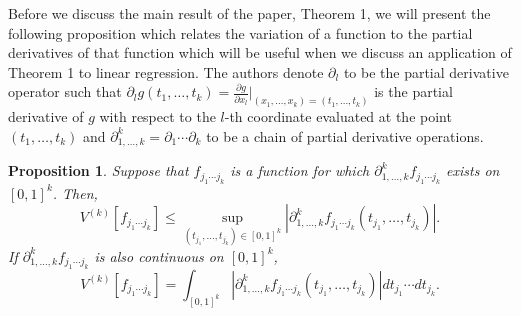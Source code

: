 \documentclass{article}
\newtheorem{proposition}{Proposition}
\begin{document}
Before we discuss the main result of the paper, Theorem 1, we will present the following proposition which relates the variation of a function to the partial derivatives of that function which will be useful when we discuss an application of Theorem 1 to linear regression. The authors denote $\partial_l$ to be the partial derivative operator such that $\partial_l g(t_1, \ldots, t_k) = \frac{\partial g}{\partial x_l} |_{(x_1, \ldots, x_k) = (t_1, \ldots, t_k)}$ is the partial derivative of $g$ with respect to the $l$-th coordinate evaluated at the point $(t_1, \ldots, t_k)$ and $\partial^{k}_{1, \ldots, k} = \partial_1 \cdots \partial_k$ to be a chain of partial derivative operations.
\begin{proposition}
    Suppose that $f_{j_1 \cdots j_k}$ is a function for which $\partial^{k}_{1, \ldots, k} f_{j_1 \cdots j_k}$ exists on $[0, 1]^k$. Then,
    \[V^{(k)}[f_{j_1 \cdots j_k}] \leq \sup_{(t_{j_1}, \ldots, t_{j_k}) \in [0, 1]^k} \left| \partial^{k}_{1, \ldots, k} f_{j_1 \cdots j_k} (t_{j_1}, \ldots, t_{j_k}) \right|.\]
    If $\partial^{k}_{1, \ldots, k} f_{j_1 \cdots j_k}$ is also continuous on $[0, 1]^k$,
    \[V^{(k)}[f_{j_1 \cdots j_k}] = \int_{[0, 1]^k} \left|\partial^{k}_{1, \ldots, k} f_{j_1 \cdots j_k} (t_{j_1}, \ldots, t_{j_k}) \right| dt_{j_1} \cdots dt_{j_k}.\]
\end{proposition}
\end{document}
